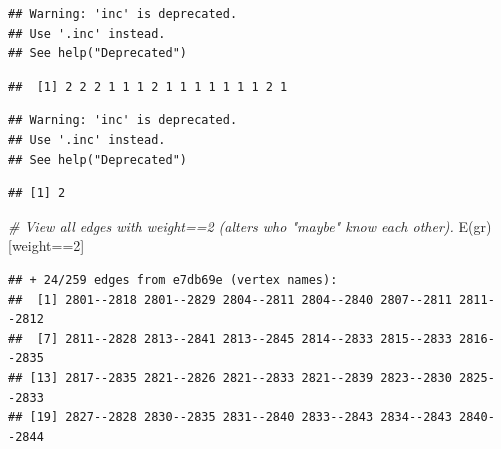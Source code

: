 \documentclass[
]{book}
\newenvironment{Shaded}{\begin{snugshade}}{\end{snugshade}}
\newcommand{\CommentTok}[1]{\textcolor[rgb]{0.56,0.35,0.01}{\textit{#1}}}
\newcommand{\DecValTok}[1]{\textcolor[rgb]{0.00,0.00,0.81}{#1}}
\newcommand{\FunctionTok}[1]{\textcolor[rgb]{0.00,0.00,0.00}{#1}}
\newcommand{\NormalTok}[1]{#1}
\newcommand{\SpecialCharTok}[1]{\textcolor[rgb]{0.00,0.00,0.00}{#1}}
\newcommand{\StringTok}[1]{\textcolor[rgb]{0.31,0.60,0.02}{#1}}
\begin{document}
\begin{Shaded}
\end{Shaded}

\begin{verbatim}
## Warning: 'inc' is deprecated.
## Use '.inc' instead.
## See help("Deprecated")
\end{verbatim}

\begin{verbatim}
##  [1] 2 2 2 1 1 1 2 1 1 1 1 1 1 1 2 1
\end{verbatim}

\begin{Shaded}
\end{Shaded}

\begin{verbatim}
## Warning: 'inc' is deprecated.
## Use '.inc' instead.
## See help("Deprecated")
\end{verbatim}

\begin{verbatim}
## [1] 2
\end{verbatim}

\begin{Shaded}
\begin{Highlighting}[]
\CommentTok{\# View all edges with weight==2 (alters who "maybe" know each other).}
\FunctionTok{E}\NormalTok{(gr)[weight}\SpecialCharTok{==}\DecValTok{2}\NormalTok{] }
\end{Highlighting}
\end{Shaded}

\begin{verbatim}
## + 24/259 edges from e7db69e (vertex names):
##  [1] 2801--2818 2801--2829 2804--2811 2804--2840 2807--2811 2811--2812
##  [7] 2811--2828 2813--2841 2813--2845 2814--2833 2815--2833 2816--2835
## [13] 2817--2835 2821--2826 2821--2833 2821--2839 2823--2830 2825--2833
## [19] 2827--2828 2830--2835 2831--2840 2833--2843 2834--2843 2840--2844
\end{verbatim}
\end{document}
